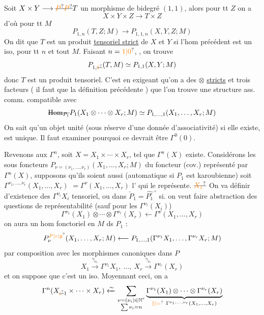 Soit $X\times Y\longrightarrow\deleted{\unsure{P}}\deleted{\unsure{P}}T$ un morphisme de bidegré $(1,1)$,
alors pour tt $Z$ on a
\[
X\times Y\times Z\longrightarrow T\times Z
\]
d'où pour tt $M$
\[
P_{1,n}(T,Z;M)\longrightarrow P_{1,1,n}(X,Y,Z;M)
\]
On dit que $T$ est un produit \uline{tensoriel strict} de
$X$ et $Y$ si l'hom précédent est un iso,
pour tt $n$ et tout $M$. Faisant $n=\unsure{1|0}$, , on trouve
\[
P_{1,\deleted{\unsure{1}}}(T,M)\simeq P_{1,1}(X,Y;M)
\]
donc $T$ est un produit tensoriel. C'est
en exigeant qu'on a des $\otimes$ \uline{stricts}  et
trois facteurs ( il faut que la définition précédente
) que l'on
trouve  une structure
ass. comm. compatible avec
\[
\deleted{\operatorname{Hom}_{P_1}} P_1(X_1\otimes\cdots\otimes X_r;M)\simeq P_{1,\ldots,1}(X_1,\ldots,X_r;M)
\]
On sait qu'un objet unité (sous réserve d'une
donnée d'associativité) si elle existe, est unique.
 Il faut examiner pourquoi ce devrait être $\Gamma^0(0)$.

Revenons aux $\Gamma^n$, soit $X=X_1\times\cdots\times X_r$,
tel que $\Gamma^n(X)$ existe. Considérons les
sous foncteurs $P_{\nu=(\nu_1,\ldots,\nu_r)}(X_1,\ldots,X_r;M)$
du foncteur  (cov.) représenté par $\Gamma^n(X)$,
supposons qu'ils soient aussi  (automatique
si $P_1$ est karoubienne) soit $\Gamma^{\nu_1,\ldots,\nu_r}(X_1,\ldots,X_r)$
$=\Gamma^\nu(X_1,\ldots,X_r)$ l' qui le représente. $\deleted{\unsure{X_1}}$
On va définir  d'existence des $\Gamma^{\nu_i}X_i$
 tensoriel,  ou dans $\check{P}_1=\widehat{P_1^\circ}^{\,\circ}$ si.
on veut faire abstraction des questions de
représentabilité (sauf pour les $\Gamma^{\nu_i}(X_i)$)
\[
\Gamma^{\nu_1}(X_1)\otimes\cdots\otimes\Gamma^{\nu_r}(X_r)\longleftarrow\Gamma^\nu(X_1,\ldots,X_r)
\]
on aura un hom fonctoriel en
$M$ ds $P_1$ :
\[
P_{\nu}^{\unsure{P|\circ|\mathfrak{g}}}(X_1,\ldots,X_r;M)\longleftarrow P_{1,\ldots,1}(\Gamma^{\nu_1}X_1,\ldots,\Gamma^{\nu_r}X_r;M)
\]
par composition avec les morphismes canoniques
dans $P$
\[
X_1\xrightarrow{\gamma_{\nu_1}}\Gamma^{\nu_1}X_1,\ \ldots,\ X_r\xrightarrow{\gamma_{\nu_r}}\Gamma^{\nu_r}(X_r)
\]
et on suppose que c'est  un iso.
Moyennant ceci, on a
\[
\Gamma^n(X_{\deleted{\unsure{i}}1}\times\cdots\times X_r)\xleftarrow{\sim}
\sum_{\substack{\nu=(\nu_i)\in\mathbb N^r\\\sum\nu_i=n}}
\underbrace{\Gamma^{\nu_1}(X_1)\otimes\cdots\otimes\Gamma^{\nu_r}(X_r)}_{\unsure{\Vert|=}\ \Gamma^{\nu_1,\ldots,\nu_r}(X_1,\ldots,X_r)}
\]

